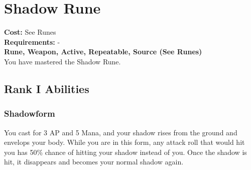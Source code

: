 \section{Shadow Rune}\label{rune:shadow}
\textbf{Cost:} See Runes\\
\textbf{Requirements:} -\\
\textbf{Rune, Weapon, Active, Repeatable, Source (See Runes)}\\
You have mastered the Shadow Rune.

\subsection{Rank I Abilities}

\subsubsection{Shadowform}
You cast for 3 AP and 5 Mana, and your shadow rises from the ground and envelops your body.
While you are in this form, any attack roll that would hit you has 50\% chance of hitting your shadow instead of you.
Once the shadow is hit, it disappears and becomes your normal shadow again.